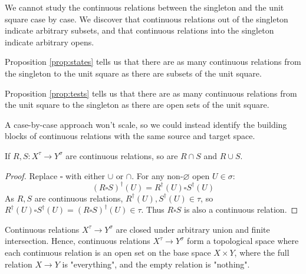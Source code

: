  We cannot study the continuous relations between the singleton and the unit square case by case. We discover that continuous relations out of the singleton indicate arbitrary subsets, and that continuous relations into the singleton indicate arbitrary opens.

\newthought{$\bullet \rightarrow \blacksquare$:} Proposition \ref{prop:states} tells us that there are as many continuous relations from the singleton to the unit square as there are subsets of the unit square.

\newthought{$\blacksquare \rightarrow \bullet$:} Proposition \ref{prop:tests} tells us that there are as many continuous relations from the unit square to the singleton as there are open sets of the unit square.

 A case-by-case approach won't scale, so we could instead identify the building blocks of continuous relations with the same source and target space.


\begin{proposition}\label{prop:framehom}
If $R,S: X^\tau \rightarrow Y^\sigma$ are continuous relations, so are $R \cap S$ and $R \cup S$.
\begin{proof}
Replace $\square$ with either $\cup$ or $\cap$. For any non-$\varnothing$ open $U \in \sigma$: \[(R \square S)^\dag (U) = R^\dag(U) \square S^\dag(U)\] As $R,S$ are continuous relations, $R^\dag(U),S^\dag(U) \in \tau$, so $R^\dag(U) \square S^\dag(U) = (R \square S)^\dag (U) \in \tau$. Thus $R\square S$ is also a continuous relation.
\end{proof}
\end{proposition}

\begin{corollary}\label{cor:homspace}
Continuous relations $X^\tau \rightarrow Y^\sigma$ are closed under arbitrary union and finite intersection. Hence, continuous relations $X^\tau \rightarrow Y^\sigma$ form a topological space where each continuous relation is an open set on the base space $X \times Y$, where the full relation $X \rightarrow Y$ is "everything", and the empty relation is "nothing".
\end{corollary}


